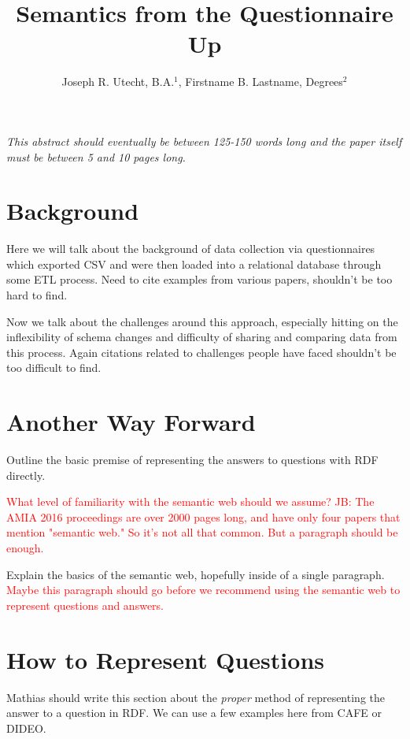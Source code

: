 \documentclass{amia}
\begin{document}
\title{Semantics from the Questionnaire Up}

\author{Joseph R. Utecht, B.A.$^{1}$, Firstname B. Lastname, Degrees$^{2}$}


\maketitle


\textit{This abstract should eventually be between 125-150 words long and the paper itself must be between 5 and 10 pages long.}

\section*{Background}
Here we will talk about the background of data collection via questionnaires which exported CSV and were then loaded into a relational database through some ETL process.  Need to cite examples from various papers, shouldn't be too hard to find.

Now we talk about the challenges around this approach, especially hitting on the inflexibility of schema changes and difficulty of sharing and comparing data from this process. Again citations related to challenges people have faced shouldn't be too difficult to find.

\section*{Another Way Forward}
Outline the basic premise of representing the answers to questions with RDF directly.

\textcolor{red}{What level of familiarity with the semantic web should we assume?}
\textcolor{red}{JB: The AMIA 2016 proceedings are over 2000 pages long, and have only four papers that mention "semantic web." So it's not all that common. But a paragraph should be enough.}

Explain the basics of the semantic web, hopefully inside of a single paragraph.
\textcolor{red}{Maybe this paragraph should go before we recommend using the semantic web to represent questions and answers.}

\section*{How to Represent Questions}
Mathias should write this section about the \emph{proper} method of representing the answer to a question in RDF. We can use a few examples here from CAFE or DIDEO.
\end{document}
